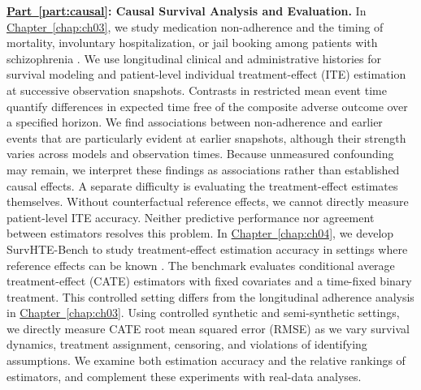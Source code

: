 \noindent\textbf{\hyperref[part:causal]{Part~\ref*{part:causal}}: Causal Survival Analysis and Evaluation.}
In \hyperref[chap:ch03]{Chapter~\ref*{chap:ch03}}, we study medication non-adherence and the timing of mortality, involuntary hospitalization, or jail booking among patients with schizophrenia \citep{noroozizadeh2025impact}.
We use longitudinal clinical and administrative histories for survival modeling and patient-level individual treatment-effect (ITE) estimation at successive observation snapshots.
Contrasts in restricted mean event time quantify differences in expected time free of the composite adverse outcome over a specified horizon.
We find associations between non-adherence and earlier events that are particularly evident at earlier snapshots, although their strength varies across models and observation times.
Because unmeasured confounding may remain, we interpret these findings as associations rather than established causal effects.
A separate difficulty is evaluating the treatment-effect estimates themselves.
Without counterfactual reference effects, we cannot directly measure patient-level ITE accuracy.
Neither predictive performance nor agreement between estimators resolves this problem.
In \hyperref[chap:ch04]{Chapter~\ref*{chap:ch04}}, we develop SurvHTE-Bench to study treatment-effect estimation accuracy in settings where reference effects can be known \citep{noroozizadeh2026survhte}.
The benchmark evaluates conditional average treatment-effect (CATE) estimators with fixed covariates and a time-fixed binary treatment.
This controlled setting differs from the longitudinal adherence analysis in \hyperref[chap:ch03]{Chapter~\ref*{chap:ch03}}.
Using controlled synthetic and semi-synthetic settings, we directly measure CATE root mean squared error (RMSE) as we vary survival dynamics, treatment assignment, censoring, and violations of identifying assumptions.
We examine both estimation accuracy and the relative rankings of estimators, and complement these experiments with real-data analyses.

